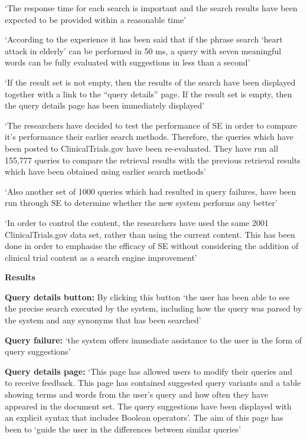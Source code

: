 \documentclass[]{article}
\begin{document}
{{‘The response time for each search is important and the search results have been expected to be provided within a reasonable time’

‘According to the experience it has been said that if the phrase search ‘heart attack in elderly’ can be performed in 50 ms, a query with seven meaningful words can be fully evaluated with suggestions in less than a second’

‘If the result set is not empty, then the results of the search have been displayed together with a link to the “query details” page. If the result set is empty, then the query details page has been immediately displayed’

‘The researchers have decided to test the performance of SE in order to compare it’s performance their earlier search methods. Therefore, the queries which have been posted to ClinicalTrials.gov have been re-evaluated. They have run all 155,777 queries to compare the retrieval results with the previous retrieval results which have been obtained using earlier search methods’

‘Also another set of 1000 queries which had resulted in query failures, have been run through SE to determine whether the new system performs any better’

‘In order to control the content, the researchers have used the same 2001 ClinicalTrials.gov data set, rather than using the current content. This has been done in order to emphasise the efficacy of SE without considering the addition of clinical trial content as a search engine improvement’

\textbf{Results}

\textbf{Query details button:} By clicking this button ‘the user has been able to see the precise search executed by the system, including how the query was parsed by the system and any synonyms that has been searched’

\textbf{Query failure:} ‘the system offers immediate assistance to the user in the form of query suggestions’

\textbf{Query details page:} ‘This page has allowed users to modify their queries and to receive feedback. This page has contained suggested query variants and a table showing terms and words from the user's query and how often they have appeared in the document set. The query suggestions have been displayed with an explicit syntax that includes Boolean operators’. The aim of this page has been to ‘guide the user in the differences between similar queries’

}}
\end{document}
